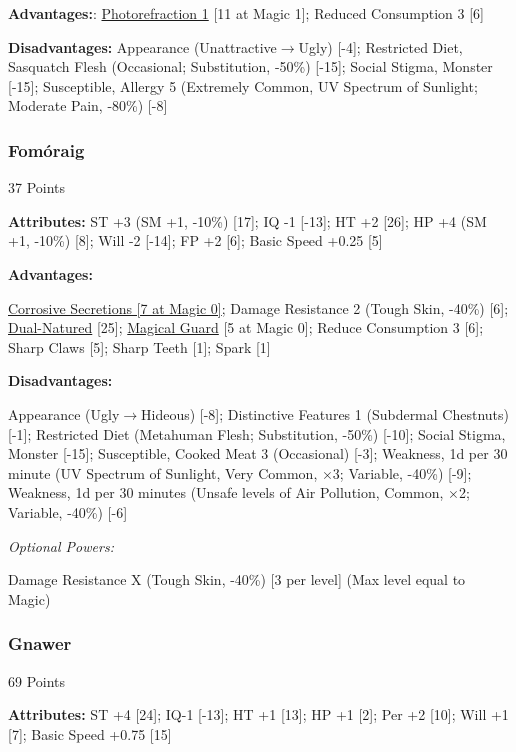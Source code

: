 \begin{multicols*}{3}
	\textbf{Advantages:}:
	\hyperref[photorefraction]{Photorefraction 1} [11 at Magic 1]; Reduced Consumption 3 [6]
	
	\textbf{Disadvantages:}	
	Appearance (Unattractive$\rightarrow$Ugly) [-4]; Restricted Diet, Sasquatch Flesh (Occasional; Substitution, -50\%) [-15]; Social Stigma, Monster [-15]; Susceptible, Allergy 5 (Extremely Common, UV Spectrum of Sunlight; Moderate Pain, -80\%) [-8] 
	
	\subsubsection{Fomóraig}\label{formoraig}
	\begin{flushright}
		37 Points
	\end{flushright}
	
	\textbf{Attributes:}
	ST +3 (SM +1, -10\%) [17]; IQ -1 [-13]; HT +2 [26]; HP +4 (SM +1, -10\%) [8]; Will -2 [-14]; FP +2 [6]; Basic Speed +0.25 [5]
	
	\textbf{Advantages:}

	\hyperref[corrosive_secretions]{Corrosive Secretions [7 at Magic 0]}; Damage Resistance 2 (Tough Skin, -40\%) [6]; \hyperref[dual_natured]{Dual-Natured} [25]; \hyperref[magical_guard]{Magical Guard} [5 at Magic 0]; Reduce Consumption 3 [6]; Sharp Claws [5]; Sharp Teeth [1]; Spark [1]
	
	\textbf{Disadvantages:}
	
	Appearance (Ugly$\rightarrow$Hideous) [-8]; Distinctive Features 1 (Subdermal Chestnuts) [-1]; Restricted Diet (Metahuman Flesh; Substitution, -50\%) [-10]; Social Stigma, Monster [-15]; Susceptible, Cooked Meat 3 (Occasional) [-3]; Weakness, 1d per 30 minute (UV Spectrum of Sunlight, Very Common, $\times$3; Variable, -40\%) [-9]; Weakness, 1d per 30 minutes (Unsafe levels of Air Pollution, Common, $\times$2; Variable, -40\%) [-6]
	
	\textit{Optional Powers:}
	
	Damage Resistance X (Tough Skin, -40\%) [3 per level] (Max level equal to Magic)
	
	\subsubsection{Gnawer}\label{gnawer}
	\begin{flushright}
		69 Points
	\end{flushright}

	\textbf{Attributes:}	
	ST +4 [24]; IQ-1 [-13]; HT +1 [13]; HP +1 [2]; Per +2 [10]; Will +1 [7]; Basic Speed +0.75 [15]
	

\end{multicols*}
